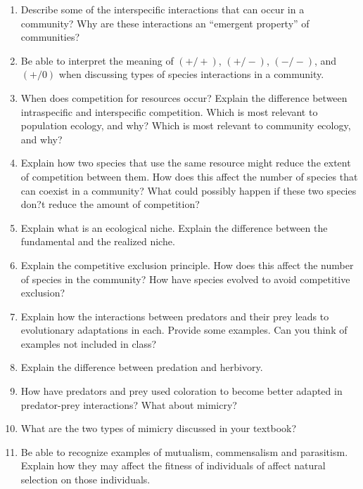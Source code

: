 \documentclass[letterpaper]{tufte-handout}
\begin{document}
\begin{enumerate}

	\item Describe some of the interspecific interactions that can occur in a community? Why are these interactions an ``emergent property'' of communities?
	
	\item Be able to interpret the meaning of $(+ / + )$, $(+ / - )$, $(- / - )$, and $(+ / 0 )$ when discussing types of species interactions in a community. 
	
	\item When does competition for resources occur?  Explain the difference between intraspecific and interspecific competition.  Which is most relevant to population ecology, and why?  Which is most relevant to community ecology, and why?

	\item Explain how two species that use the same resource might reduce the extent of competition between them.  How does this affect the number of species that can coexist in a community?  What could possibly happen if these two species don?t reduce the amount of competition?

	\item Explain what is an ecological niche. Explain the difference between the fundamental and the realized niche.
	
	\item Explain the competitive exclusion principle. How does this affect the number of species in the community? How have species evolved to avoid competitive exclusion?

	\item Explain how the interactions between predators and their prey leads to evolutionary adaptations in each.  Provide some examples.  Can you think of examples not included in class?
	
	\item Explain the difference between predation and herbivory.

	\item How have predators and prey used coloration to become better adapted in predator-prey interactions?  What about mimicry?
	
	\item What are the two types of mimicry discussed in your textbook?

	\item Be able to recognize examples of mutualism, commensalism and parasitism.  Explain how they may affect the fitness of individuals of affect natural selection on those individuals.


\end{enumerate}
\end{document}
